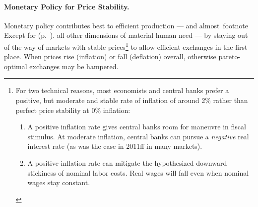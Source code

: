 
\paragraph{Monetary Policy for Price Stability.}  \label{sec:price-stability} Monetary policy contributes best to efficient production --- and almost\
footnote{
	Except for  (p.~\pageref{sec:monetary-stimulus}).
}
all other dimensions of material human need --- by staying out of the way of markets with stable prices\footnote{
	For two technical reasons, most economists and central banks prefer a positive, but moderate and stable rate of inflation of around 2\% rather than perfect price stability at 0\% inflation:
	\begin{enumerate}
		\item A positive inflation rate gives central banks room for maneuvre in fiscal stimulus. At moderate inflation, central banks can pursue a \emph{negative} real interest rate (as was the case in 2011ff in many markets). 
		\item A positive inflation rate can mitigate the hypothesized downward stickiness of nominal labor costs. Real wages will fall even when nominal wages stay constant.%
	\end{enumerate}} 
to allow efficient exchanges in the first place. When prices rise (inflation) or fall (deflation) overall, otherwise pareto-optimal exchanges may be hampered. 

